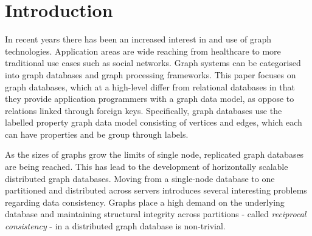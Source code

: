 \documentclass[sigplan,screen]{acmart}
\begin{document}





\maketitle

\section{Introduction}
In recent years there has been an increased interest in and use of graph technologies. Application areas are wide reaching from healthcare to more traditional use cases such as social networks. Graph systems can be categorised into graph databases and graph processing frameworks. This paper focuses on graph databases, which at a high-level differ from relational databases in that they provide application programmers with a graph data model, as oppose to relations linked through foreign keys. Specifically, graph databases use the labelled property graph data model consisting of vertices and edges, which each can have properties and be group through labels.

As the sizes of graphs grow the limits of single node, replicated graph databases are being reached. This has lead to the development of horizontally scalable distributed graph databases. Moving from a single-node database to one partitioned and distributed across servers introduces several interesting problems regarding data consistency. Graphs place a high demand on the underlying database and maintaining structural integrity across partitions - called \textit{reciprocal consistency} - in a distributed graph database is non-trivial.
\end{document}
